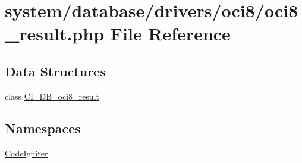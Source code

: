 \hypertarget{oci8__result_8php}{}\section{system/database/drivers/oci8/oci8\+\_\+result.php File Reference}
\label{oci8__result_8php}
\subsection*{Data Structures}
\begin{DoxyCompactItemize}
\item 
class \mbox{\hyperlink{class_c_i___d_b__oci8__result}{C\+I\+\_\+\+D\+B\+\_\+oci8\+\_\+result}}
\end{DoxyCompactItemize}
\subsection*{Namespaces}
\begin{DoxyCompactItemize}
\item 
 \mbox{\hyperlink{namespace_code_igniter}{Code\+Igniter}}
\end{DoxyCompactItemize}
